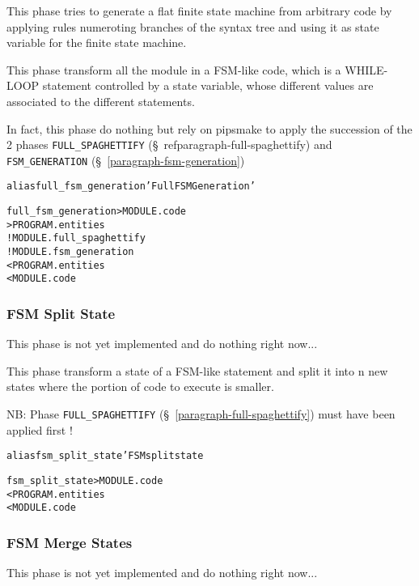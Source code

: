 \documentclass[a4paper]{report}
\newenvironment{PipsMake}{\begin{alltt}}{\end{alltt}}
\begin{document}
This phase tries to generate a flat finite state machine from arbitrary
code by applying rules numeroting branches of the syntax tree and using it
as state variable for the finite state machine.

This phase transform all the module in a FSM-like code, which is a
WHILE-LOOP statement controlled by a state variable, whose different
values are associated to the different statements.

In fact, this phase do nothing but rely on pipsmake to apply the
succession of the 2 phases \texttt{FULL\_SPAGHETTIFY}
(\S~ref{paragraph-full-spaghettify}) and \texttt{FSM\_GENERATION}
(\S~\ref{paragraph-fsm-generation})

\begin{PipsMake}
alias full_fsm_generation 'Full FSM Generation'

full_fsm_generation   > MODULE.code
                      > PROGRAM.entities
        ! MODULE.full_spaghettify
        ! MODULE.fsm_generation
        < PROGRAM.entities
        < MODULE.code
\end{PipsMake}

\subsubsection{FSM Split State}
\label{paragraph-fsm-split-state}

This phase is not yet implemented and do nothing right now...

This phase transform a state of a FSM-like statement and split it into n
new states where the portion of code to execute is smaller.

NB: Phase \texttt{FULL\_SPAGHETTIFY} (\S~\ref{paragraph-full-spaghettify})
must have been applied first !

\begin{PipsMake}
alias fsm_split_state 'FSM split state

fsm_split_state    > MODULE.code
        < PROGRAM.entities
        < MODULE.code
\end{PipsMake}

\subsubsection{FSM Merge States}
\label{paragraph-fsm-merge-states}

This phase is not yet implemented and do nothing right now...
\end{document}
